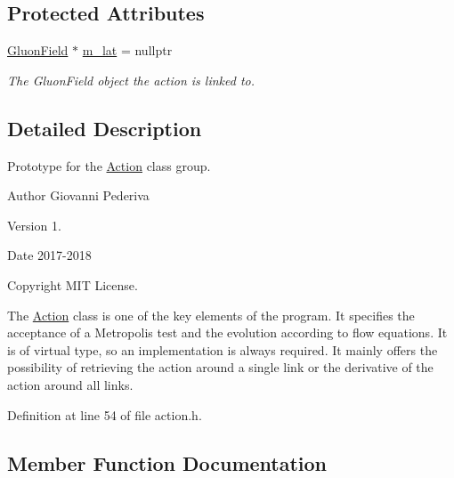 \subsection*{Protected Attributes}
\begin{DoxyCompactItemize}
\item 
\hyperlink{field_8h_afe80b127697eba6d6e7fbd8121c8d4ee}{Gluon\+Field} $\ast$ \hyperlink{classAction_adfb7bb92099e0a908efaa4715e75fffd}{m\+\_\+lat} = nullptr\hypertarget{classAction_adfb7bb92099e0a908efaa4715e75fffd}{}\label{classAction_adfb7bb92099e0a908efaa4715e75fffd}

\begin{DoxyCompactList}\small\item\em The Gluon\+Field object the action is linked to. \end{DoxyCompactList}\end{DoxyCompactItemize}


\subsection{Detailed Description}
Prototype for the \hyperlink{classAction}{Action} class group. 

\begin{DoxyAuthor}{Author}
Giovanni Pederiva 
\end{DoxyAuthor}
\begin{DoxyVersion}{Version}
1. 
\end{DoxyVersion}
\begin{DoxyDate}{Date}
2017-\/2018 
\end{DoxyDate}
\begin{DoxyCopyright}{Copyright}
M\+IT License.
\end{DoxyCopyright}
The \hyperlink{classAction}{Action} class is one of the key elements of the program. It specifies the acceptance of a Metropolis test and the evolution according to flow equations. It is of virtual type, so an implementation is always required. It mainly offers the possibility of retrieving the action around a single link or the derivative of the action around all links. 

Definition at line 54 of file action.\+h.



\subsection{Member Function Documentation}
